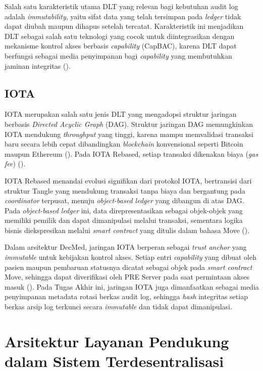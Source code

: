 Salah satu karakteristik utama DLT yang relevan bagi kebutuhan audit
log adalah \textit{immutability}, yaitu sifat data yang telah tersimpan
pada \textit{ledger} tidak dapat diubah maupun dihapus setelah tercatat.
Karakteristik ini menjadikan DLT sebagai salah satu teknologi yang cocok
untuk diintegrasikan dengan mekanisme kontrol akses berbasis
\textit{capability} (CapBAC), karena DLT dapat berfungsi sebagai media
penyimpanan bagi \textit{capability} yang membutuhkan jaminan integritas
(\cite{DecMed}).

\subsection{IOTA}
\label{subsec:iota}

IOTA merupakan salah satu jenis DLT yang mengadopsi struktur jaringan
berbasis \textit{Directed Acyclic Graph} (DAG). Struktur jaringan DAG
memungkinkan IOTA mendukung \textit{throughput} yang tinggi, karena
mampu memvalidasi transaksi baru secara lebih cepat dibandingkan
\textit{blockchain} konvensional seperti Bitcoin maupun Ethereum
(\cite{DecMed}). Pada IOTA Rebased, setiap transaksi dikenakan biaya
(\textit{gas fee}) (\cite{DecMed}).

IOTA Rebased menandai evolusi signifikan dari protokol IOTA, bertransisi
dari struktur Tangle yang mendukung transaksi tanpa biaya dan bergantung
pada \textit{coordinator} terpusat, menuju \textit{object-based ledger}
yang dibangun di atas DAG. Pada \textit{object-based ledger} ini, data
direpresentasikan sebagai objek-objek yang memiliki pemilik dan dapat
dimanipulasi melalui transaksi, sementara logika bisnis diekspresikan
melalui \textit{smart contract} yang ditulis dalam bahasa Move
(\cite{DecMed}).

Dalam arsitektur DecMed, jaringan IOTA berperan sebagai \textit{trust
anchor} yang \textit{immutable} untuk kebijakan kontrol akses. Setiap
entri \textit{capability} yang dibuat oleh pasien maupun pembaruan
statusnya dicatat sebagai objek pada \textit{smart contract} Move,
sehingga dapat diverifikasi oleh PRE Server pada saat permintaan akses
masuk (\cite{DecMed}). Pada Tugas Akhir ini, jaringan IOTA juga
dimanfaatkan sebagai media penyimpanan metadata rotasi berkas audit log,
sehingga \textit{hash} integritas setiap berkas arsip log terkunci
secara \textit{immutable} dan tidak dapat dimanipulasi.

\section{Arsitektur Layanan Pendukung dalam Sistem Terdesentralisasi}
\label{sec:arsitektur-layanan-pendukung}

